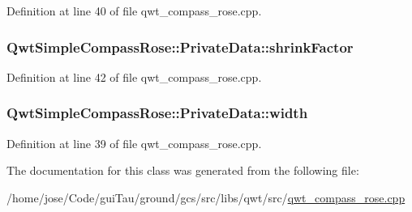 Definition at line 40 of file qwt\-\_\-compass\-\_\-rose.\-cpp.

\hypertarget{class_qwt_simple_compass_rose_1_1_private_data_abf2ea42937a1c22ddcac53b384e88c69}{
\subsubsection[{shrink\-Factor}]{ Qwt\-Simple\-Compass\-Rose\-::\-Private\-Data\-::shrink\-Factor}}\label{class_qwt_simple_compass_rose_1_1_private_data_abf2ea42937a1c22ddcac53b384e88c69}


Definition at line 42 of file qwt\-\_\-compass\-\_\-rose.\-cpp.

\hypertarget{class_qwt_simple_compass_rose_1_1_private_data_ae8321c4088bf8fd76d5a47fba1131761}{
\subsubsection[{width}]{ Qwt\-Simple\-Compass\-Rose\-::\-Private\-Data\-::width}}\label{class_qwt_simple_compass_rose_1_1_private_data_ae8321c4088bf8fd76d5a47fba1131761}


Definition at line 39 of file qwt\-\_\-compass\-\_\-rose.\-cpp.



The documentation for this class was generated from the following file\-:\begin{DoxyCompactItemize}
\item 
/home/jose/\-Code/gui\-Tau/ground/gcs/src/libs/qwt/src/\hyperlink{qwt__compass__rose_8cpp}{qwt\-\_\-compass\-\_\-rose.\-cpp}\end{DoxyCompactItemize}
